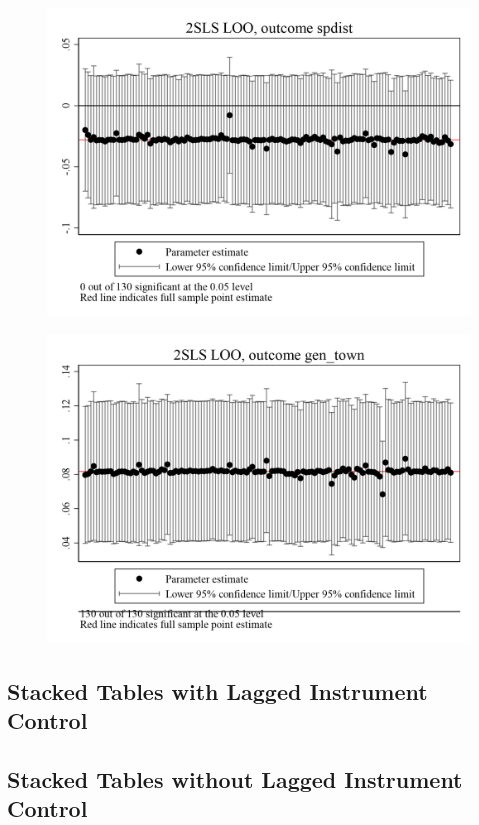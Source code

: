 \documentclass{article}
\begin{document}
\clearpage
\begin{figure}
	\centering
	\includegraphics[width=.8\textwidth]{figures/exogeneity_tests/loo_iv_spdist.png}
\end{figure}
\clearpage
\begin{figure}
	\centering
	\includegraphics[width=.8\textwidth]{figures/exogeneity_tests/loo_iv_gen_town.png}
\end{figure}
\clearpage

\subsection{Stacked Tables with Lagged Instrument Control}


\clearpage


\clearpage

\subsection{Stacked Tables without Lagged Instrument Control}


\clearpage


\clearpage
\end{document}
